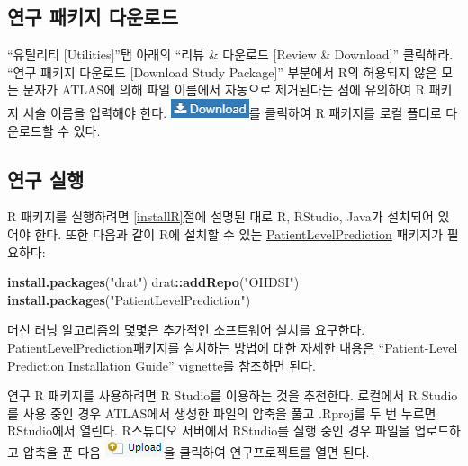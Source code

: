 \documentclass[11pt]{book}
\newenvironment{Shaded}{\begin{snugshade}}{\end{snugshade}}
\newcommand{\KeywordTok}[1]{\textcolor[rgb]{0.13,0.29,0.53}{\textbf{#1}}}
\newcommand{\StringTok}[1]{\textcolor[rgb]{0.31,0.60,0.02}{#1}}
\newcommand{\OperatorTok}[1]{\textcolor[rgb]{0.81,0.36,0.00}{\textbf{#1}}}
\newcommand{\NormalTok}[1]{#1}
\theoremstyle{definition}
\theoremstyle{definition}
\theoremstyle{definition}
\theoremstyle{remark}
\begin{document}
\subsection{연구 패키지 다운로드}\label{--}

``유틸리티 {[}Utilities{]}''탭 아래의 ``리뷰 \& 다운로드 {[}Review \&
Download{]}'' 클릭해라. ``연구 패키지 다운로드 {[}Download Study
Package{]}'' 부분에서 R의 허용되지 않은 모든 문자가 ATLAS에 의해 파일
이름에서 자동으로 제거된다는 점에 유의하여 R 패키지 서술 이름을 입력해야
한다. \includegraphics{images/PatientLevelPrediction/download.png}를
클릭하여 R 패키지를 로컬 폴더로 다운로드할 수 있다.

\subsection{연구 실행}\label{-}

R 패키지를 실행하려면 \ref{installR}절에 설명된 대로 R, RStudio, Java가
설치되어 있어야 한다. 또한 다음과 같이 R에 설치할 수 있는
\href{https://ohdsi.github.io/PatientLevelPrediction/}{PatientLevelPrediction}
패키지가 필요하다:

\begin{Shaded}
\begin{Highlighting}[]
\KeywordTok{install.packages}\NormalTok{(}\StringTok{"drat"}\NormalTok{)}
\NormalTok{drat}\OperatorTok{::}\KeywordTok{addRepo}\NormalTok{(}\StringTok{"OHDSI"}\NormalTok{)}
\KeywordTok{install.packages}\NormalTok{(}\StringTok{"PatientLevelPrediction"}\NormalTok{)}
\end{Highlighting}
\end{Shaded}

머신 러닝 알고리즘의 몇몇은 추가적인 소프트웨어 설치를 요구한다.
\href{https://ohdsi.github.io/PatientLevelPrediction/}{PatientLevelPrediction}패키지를
설치하는 방법에 대한 자세한 내용은
\href{https://ohdsi.github.io/PatientLevelPrediction/articles/InstallationGuide.html}{``Patient-Level
Prediction Installation Guide'' vignette}를 참조하면 된다.

연구 R 패키지를 사용하려면 R Studio를 이용하는 것을 추천한다. 로컬에서 R
Studio를 사용 중인 경우 ATLAS에서 생성한 파일의 압축을 풀고 .Rproj를 두
번 누르면 RStudio에서 열린다. R스튜디오 서버에서 RStudio를 실행 중인
경우 파일을 업로드하고 압축을 푼 다음
\includegraphics{images/PopulationLevelEstimation/upload.png}을 클릭하여
연구프로젝트를 열면 된다.
\end{document}
